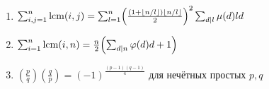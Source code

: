 \begin{enumerate}
\item %
$\sum_{i,j=1}^n\operatorname{lcm}(i,j)
=\sum_{l=1}^n\Bigl(\frac{(1+\lfloor n/l\rfloor)\lfloor n/l\rfloor}{2}\Bigr)^2\sum_{d\mid l}\mu(d)ld$

\item %
$\sum_{i=1}^n\operatorname{lcm}(i,n)=\frac{n}{2}\Bigl(\sum_{d\mid n}\varphi(d)d+1\Bigr)$

\item %
$\left(\tfrac{p}{q}\right)\left(\tfrac{q}{p}\right)=(-1)^{\frac{(p-1)(q-1)}{4}}$
 для нечётных простых $p,q$

\end{enumerate}

\endgroup



